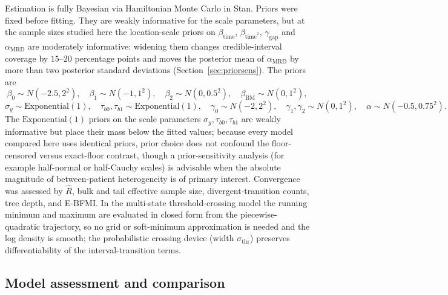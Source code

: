 \documentclass[11pt]{article}
\begin{document}
Estimation is fully Bayesian via Hamiltonian Monte Carlo in Stan.
Priors were fixed before fitting. They are weakly informative for the scale
parameters, but at the sample sizes studied here the location-scale priors on
$\beta_{\mathrm{time}}$, $\beta_{\mathrm{time}^2}$, $\gamma_{\mathrm{gap}}$ and
$\alpha_{\mathrm{MRD}}$ are moderately informative: widening them changes
credible-interval coverage by $15$--$20$ percentage points and moves the
posterior mean of $\alpha_{\mathrm{MRD}}$ by more than two posterior standard
deviations (Section~\ref{sec:priorsens}). The priors are
\[
\beta_0\sim N(-2.5,2^2),\quad
\beta_1\sim N(-1,1^2),\quad
\beta_2\sim N(0,0.5^2),\quad
\beta_{\mathrm{BM}}\sim N(0,1^2),
\]
\[
\sigma_y\sim \mathrm{Exponential}(1),\quad
\tau_{b0},\tau_{b1}\sim \mathrm{Exponential}(1),\quad
\gamma_0\sim N(-2,2^2),\quad
\gamma_1,\gamma_2\sim N(0,1^2),\quad
\alpha\sim N(-0.5,0.75^2).
\]
The $\mathrm{Exponential}(1)$ priors on the scale parameters
$\sigma_y,\tau_{b0},\tau_{b1}$ are weakly informative but place their mass
below the fitted values; because every model compared here uses identical
priors, prior choice does not confound the floor-censored versus exact-floor
contrast, though a prior-sensitivity analysis (for example half-normal or
half-Cauchy scales) is advisable when the absolute magnitude of
between-patient heterogeneity is of primary interest.
Convergence was assessed by $\widehat{R}$, bulk and tail effective sample
size, divergent-transition counts, tree depth, and E-BFMI. In the multi-state threshold-crossing model the running minimum and maximum
are evaluated in closed form from the piecewise-quadratic trajectory, so no
grid or soft-minimum approximation is needed and the log density is smooth;
the probabilistic crossing device (width $\sigma_{\mathrm{thr}}$) preserves
differentiability of the interval-transition terms.

\subsection{Model assessment and comparison}
\label{sec:assessment}
\end{document}
